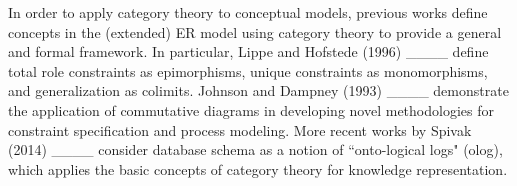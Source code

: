 In order to apply category theory to conceptual models, previous works define concepts in the (extended) ER model using category theory to provide a general and formal framework. In particular, Lippe and Hofstede (1996) ____ define total role constraints as epimorphisms, unique constraints as monomorphisms, and generalization as colimits. Johnson and Dampney (1993) ____ demonstrate the application of commutative diagrams in developing novel methodologies for constraint specification and process modeling. More recent works by Spivak  (2014) ____  consider database schema as a notion of ``onto-logical logs" (olog), which applies the basic concepts of category theory for knowledge representation. 










